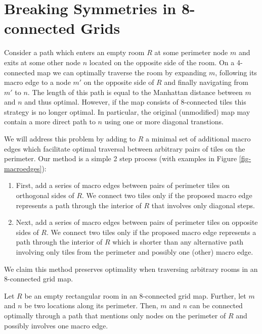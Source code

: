 \section{Breaking Symmetries in 8-connected Grids}
Consider a path which enters an empty room $R$ at some perimeter node $m$ and exits at some other
node $n$ located on the opposite side of the room.
On a 4-connected map we can optimally traverse the room by expanding $m$, following
its macro edge to a node $m'$ on the opposite side of $R$ and finally navigating from $m'$ to $n$.
The length of this path is equal to the Manhattan distance between $m$ and $n$ and thus optimal.
However, if the map consists of 8-connected tiles this strategy is no longer optimal.
In particular, the original (unmodified) map may contain a more direct path to $n$ using one or more diagonal
transtions.
\par
We will address this problem by adding to $R$ a minimal set of additional macro edges
which facilitate optimal traversal between arbitrary pairs of tiles on the perimeter.
Our method is a simple 2 step process (with examples in Figure \ref{fig-macroedges}):

\begin{enumerate}
\item{First, add a series of macro edges between pairs of perimeter tiles on orthogonal sides of $R$. 
We connect two tiles only if the proposed macro edge represents a path through the interior of $R$ that involves
only diagonal steps. }
\item{Next, add a series of macro edges between pairs of perimeter tiles on opposite sides of $R$.
We connect two tiles only if the proposed macro edge represents a path through the interior of $R$ which is shorter
than any alternative path involving only tiles from the perimeter and possibly one (other) macro edge.
}
\end{enumerate}
We claim this method preserves optimality when traversing arbitrary rooms in an 8-connected grid map.
\begin{lemma}
Let $R$ be an empty rectangular room in an 8-connected grid map.
Further, let $m$ and $n$ be two locations along its perimeter.
Then, $m$ and $n$ can be connected optimally through a path that mentions only nodes on the perimeter of $R$ and
possibly involves one macro edge.
\end{lemma}

